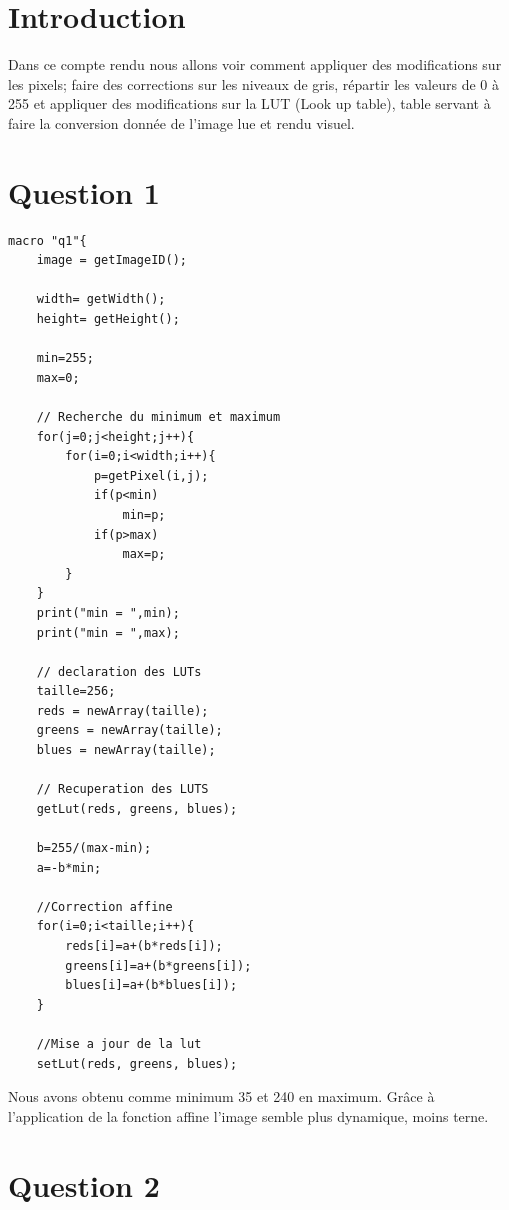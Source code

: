 \documentclass[a4paper,12pt]{report}
\begin{document}


\setcounter{page}{1} 
\newpage

\section*{Introduction}

Dans ce compte rendu nous allons voir comment appliquer des modifications sur les pixels; faire des corrections sur les niveaux de gris, répartir les valeurs de 0 à 255 et appliquer des modifications sur la LUT (Look up table), table servant à faire la conversion donnée de l'image lue et rendu visuel.
	
\section*{Question 1}

\begin{lstlisting}macro "q1"{
	image = getImageID();
	
	width= getWidth();
	height= getHeight();

	min=255;
	max=0;

	// Recherche du minimum et maximum
	for(j=0;j<height;j++){
		for(i=0;i<width;i++){
			p=getPixel(i,j);
			if(p<min)
				min=p;
			if(p>max)
				max=p;
		}
	}
	print("min = ",min);
	print("min = ",max);
	
	// declaration des LUTs
	taille=256;
    reds = newArray(taille); 
    greens = newArray(taille); 
    blues = newArray(taille);

	// Recuperation des LUTS
    getLut(reds, greens, blues);
	
	b=255/(max-min);
	a=-b*min;
	
	//Correction affine
	for(i=0;i<taille;i++){
		reds[i]=a+(b*reds[i]);
		greens[i]=a+(b*greens[i]);
		blues[i]=a+(b*blues[i]);
	}
	
	//Mise a jour de la lut
	setLut(reds, greens, blues);
\end{lstlisting}

Nous avons obtenu comme minimum 35 et 240 en maximum. Grâce à l'application de la fonction affine l'image semble plus dynamique, moins terne.

\newpage
	
\section*{Question 2}
\end{document}
